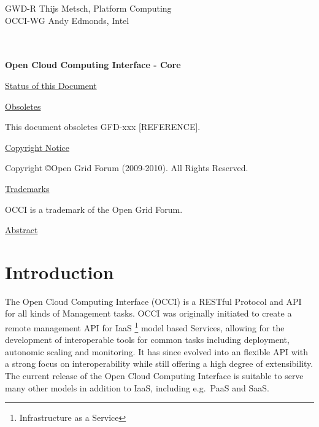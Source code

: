 \documentclass[10pt,a4paper,british]{article}
\begin{document}
\thispagestyle{empty}

GWD-R \hfill  Thijs Metsch, Platform Computing\\
OCCI-WG \hfill  Andy Edmonds, Intel\\
\\
\\

\vspace*{0.5in}

\begin{Large}
\textbf{Open Cloud Computing Interface - Core}
\end{Large}

\vspace*{0.5in}

\underline{Status of this Document}



\underline{Obsoletes}

This document obsoletes GFD-xxx [REFERENCE].

\underline{Copyright Notice}

Copyright \copyright Open Grid Forum (2009-2010). All Rights Reserved.

\underline{Trademarks}

OCCI is a trademark of the Open Grid Forum.

\underline{Abstract}



\newpage
\tableofcontents
\newpage

\section{Introduction}
The Open Cloud Computing Interface (OCCI) is a RESTful Protocol and
API for all kinds of Management tasks. OCCI was originally initiated
to create a remote management API for IaaS%
\footnote{Infrastructure as a Service}
model based Services, allowing for the development of interoperable tools for
common tasks including deployment, autonomic scaling and monitoring.
%
It has since evolved into an flexible API with a strong focus on
interoperability while still offering a high degree of extensibility. The
current release of the Open Cloud Computing Interface is suitable to serve many
other models in addition to IaaS, including e.g.~PaaS and SaaS.
\end{document}
